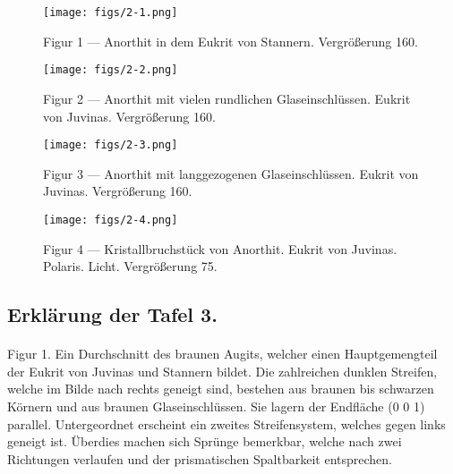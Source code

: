 \documentclass[a4paper, 12pt, oneside]{article}
\begin{document}
\vspace*{\fill}
\begin{figure}[H]
\centering
\texttt{[image: figs/2-1.png]}
\caption{\small Figur 1 --- Anorthit in dem Eukrit von Stannern. Vergrößerung 160.}
\end{figure}
\vspace*{\fill}
\clearpage

\vspace*{\fill}
\begin{figure}[H]
\centering
\texttt{[image: figs/2-2.png]}
\caption{\small Figur 2 --- Anorthit mit vielen rundlichen Glaseinschlüssen. Eukrit von Juvinas. Vergrößerung 160.}
\end{figure}
\vspace*{\fill}
\clearpage

\vspace*{\fill}
\begin{figure}[H]
\centering
\texttt{[image: figs/2-3.png]}
\caption{\small Figur 3 --- Anorthit mit langgezogenen Glaseinschlüssen. Eukrit von Juvinas. Vergrößerung 160.}
\end{figure}
\vspace*{\fill}
\clearpage

\vspace*{\fill}
\begin{figure}[H]
\centering
\texttt{[image: figs/2-4.png]}
\caption{\small Figur 4 --- Kristallbruchstück von Anorthit. Eukrit von Juvinas. Polaris. Licht. Vergrößerung 75.}
\end{figure}
\vspace*{\fill}
\clearpage

\subsection{Erklärung der Tafel 3.}
\paragraph{}
Figur 1. Ein Durchschnitt des braunen Augits, welcher einen Hauptgemengteil der Eukrit von Juvinas und Stannern bildet. Die zahlreichen dunklen Streifen, welche im Bilde nach rechts geneigt sind, bestehen aus braunen bis schwarzen Körnern und aus braunen Glaseinschlüssen. Sie lagern der Endfläche (0 0 1) parallel. Untergeordnet erscheint ein zweites Streifensystem, welches gegen links geneigt ist. Überdies machen sich Sprünge bemerkbar, welche nach zwei Richtungen verlaufen und der prismatischen Spaltbarkeit entsprechen.
\end{document}

